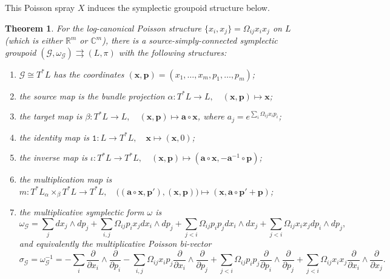 \documentclass{amsart}
\newtheorem{theorem}{Theorem}[section]
\numberwithin{equation}{section}
\newcommand{\bfa}{{\boldsymbol{a}}}
\newcommand{\bfp}{{\boldsymbol{p}}}
\newcommand{\bfx}{{\boldsymbol{x}}}
\newcommand{\cG}{\mathcal{G}}
\newcommand{\CC}{\mathbb{C}}
\newcommand{\RR}{\mathbb{R}}
\newcommand{\rra}{\rightrightarrows}
\begin{document}
This Poisson spray $X$ induces the symplectic groupoid structure below.
\begin{theorem} 
  \label{thm:PoiSpLogC}
  For the log-canonical Poisson structure $\{x_i, x_j\} = \Omega_{ij} x_i x_j$ on $L$ (which is either $\RR^m$ or $\CC^m$), there is a source-simply-connected symplectic groupoid $(\cG, \omega_\cG) \rra (L, \pi)$ with the following structures:
  \begin{enumerate}
    \item $\cG \cong T^*L$ has the coordinates $(\bfx, \bfp) = (x_1, \ldots, x_m, p_1, \ldots, p_m)$;
    \item the source map is the bundle projection $\alpha: T^*L \to L, \quad (\bfx, \bfp) \mapsto \bfx$;
    \item the target map is $\beta: T^*L \to L, \quad (\bfx, \bfp) \mapsto \bfa \circ \bfx$, where $a_j = e^{\sum_i \Omega_{ij} x_ip_i}$;
    \item the identity map is $\mathtt{1}: L \to T^*L, \quad \bfx \mapsto (\bfx, 0)$;
    \item the inverse map is $\iota: T^*L \to T^*L, \quad (\bfx, \bfp) \mapsto (\bfa \circ \bfx, -\bfa^{-1} \circ \bfp)$;
    \item the multiplication map is $m: T^*L {_\alpha \times_\beta} T^*L \to T^*L, \quad \big((\bfa \circ \bfx, \bfp'), (\bfx, \bfp)\big) \mapsto (\bfx, \bfa \circ \bfp' + \bfp)$;
    \item the multiplicative symplectic form $\omega$ is
      \begin{equation}
	\omega_\cG = \sum_{j} dx_j \wedge dp_j + \sum_{i, j} \Omega_{ij}p_ix_j dx_i \wedge dp_j + \sum_{j < i} \Omega_{ij}p_ip_j dx_i \wedge dx_j + \sum_{j < i} \Omega_{ij}x_ix_j dp_i \wedge dp_j, 
      \end{equation}
      and equivalently the multiplicative Poisson bi-vector
      \begin{equation}
        \label{eq:2-formGA}
      	\sigma_\cG = \omega_\cG^{-1} = -\sum_{i} \frac{\partial}{\partial x_i} \wedge \frac{\partial}{\partial p_i} - \sum_{i, j} \Omega_{ij} x_i p_j \frac{\partial}{\partial x_i} \wedge \frac{\partial}{\partial p_j} +\sum_{j < i} \Omega_{ij}p_ip_j \frac{\partial}{\partial p_i} \wedge \frac{\partial}{\partial p_j} +\sum_{j < i} \Omega_{ij}x_ix_j \frac{\partial}{\partial x_i} \wedge \frac{\partial}{\partial x_j}.
      \end{equation}
  \end{enumerate}
\end{theorem}
\end{document}
